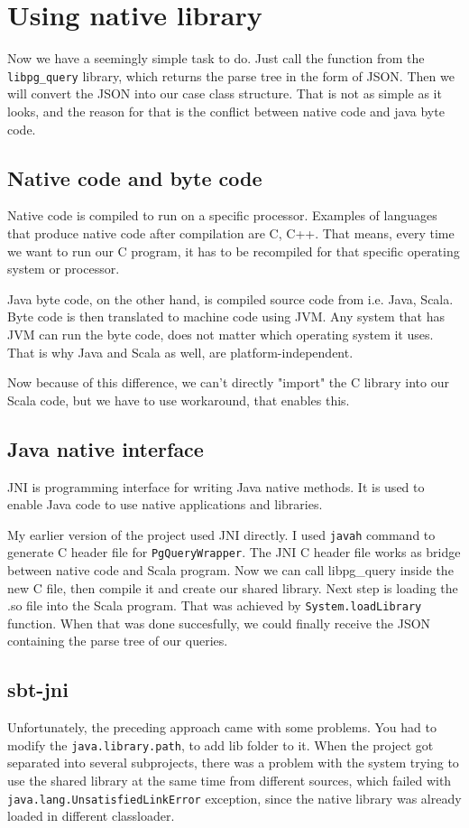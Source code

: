 \documentclass[thesis=B,english]{FITthesis}[2019/12/23]
\begin{document}
\section{Using native library}
Now we have a seemingly simple task to do. Just call the function from the \texttt{libpg\_query} library, which returns the parse tree in the form of JSON. Then we will convert the JSON into our case class structure. That is not as simple as it looks, and the reason for that is the conflict between native code and java byte code. 

\subsection{Native code and byte code}
Native code is compiled to run on a specific processor. Examples of languages that produce native code after compilation are C, C++. That means, every time we want to run our C program, it has to be recompiled for that specific operating system or processor.

Java byte code, on the other hand, is compiled source code from i.e. Java, Scala. Byte code is then translated to machine code using JVM. Any system that has JVM can run the byte code, does not matter which operating system it uses. That is why Java and Scala as well, are platform-independent.

Now because of this difference, we can't directly "import" the C library into our Scala code, but we have to use workaround, that enables this.

\subsection{Java native interface}
JNI is programming interface for writing Java native methods.\cite{JNI} It is used to enable Java code to use native applications and libraries. 

My earlier version of the project used JNI directly. I used \texttt{javah} command to generate C header file for \texttt{PgQueryWrapper}. The JNI C header file works as bridge between native code and Scala program. Now we can call libpg\_query inside the new C file, then compile it and create our shared library. Next step is loading the .so file into the Scala program. That was achieved by \texttt{System.loadLibrary} function. When that was done succesfully, we could finally receive the JSON containing the parse tree of our queries.

\subsection{sbt-jni}
Unfortunately, the preceding approach came with some problems. You had to modify the \texttt{java.library.path}, to add lib folder to it. When the project got separated into several subprojects, there was a problem with the system trying to use the shared library at the same time from different sources, which failed with \texttt{java.lang.UnsatisfiedLinkError} exception, since the native library was already loaded in different classloader. 
\end{document}
